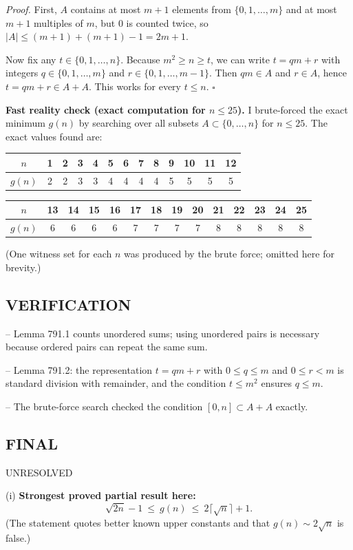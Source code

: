 \emph{Proof.}
First, $A$ contains at most $m+1$ elements from $\{0,1,\dots,m\}$ and at most $m+1$ multiples of $m$, but $0$ is counted twice, so $|A|\le (m+1)+(m+1)-1=2m+1$.

Now fix any $t\in\{0,1,\dots,n\}$. Because $m^2\ge n\ge t$, we can write
$t=qm+r$ with integers $q\in\{0,1,\dots,m\}$ and $r\in\{0,1,\dots,m-1\}$.
Then $qm\in A$ and $r\in A$, hence $t=qm+r\in A+A$. This works for every $t\le n$.
\hfill$\square$

\medskip
\textbf{Fast reality check (exact computation for $n\le 25$).}
I brute-forced the exact minimum $g(n)$ by searching over all subsets $A\subset\{0,\dots,n\}$ for $n\le 25$.
The exact values found are:
\begin{center}
\begin{tabular}{c|cccccccccccc}
$n$ &1&2&3&4&5&6&7&8&9&10&11&12\\\hline
$g(n)$ &2&2&3&3&4&4&4&4&5&5&5&5
\end{tabular}

\medskip
\begin{tabular}{c|ccccccccccccc}
$n$ &13&14&15&16&17&18&19&20&21&22&23&24&25\\\hline
$g(n)$ &6&6&6&6&7&7&7&7&8&8&8&8&8
\end{tabular}
\end{center}
(One witness set for each $n$ was produced by the brute force; omitted here for brevity.)

\subsection*{VERIFICATION}
-- Lemma 791.1 counts unordered sums; using unordered pairs is necessary because ordered pairs can repeat the same sum.

-- Lemma 791.2: the representation $t=qm+r$ with $0\le q\le m$ and $0\le r<m$ is standard division with remainder, and the condition $t\le m^2$ ensures $q\le m$.

-- The brute-force search checked the condition $[0,n]\subset A+A$ exactly.

\subsection*{FINAL}
UNRESOLVED

(i) \textbf{Strongest proved partial result here:}
\[\sqrt{2n}-1\ \le\ g(n)\ \le\ 2\lceil\sqrt n\rceil+1.
\]
(The statement quotes better known upper constants and that $g(n)\sim 2\sqrt n$ is false.)

